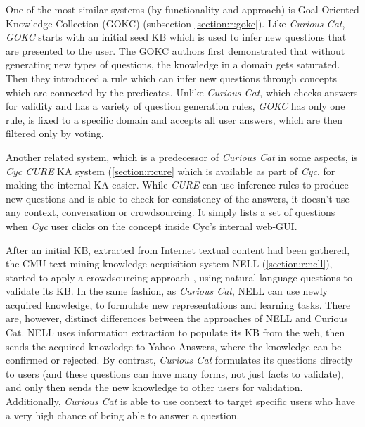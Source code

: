 One of the most similar systems (by functionality and approach) is 
Goal Oriented Knowledge Collection (GOKC) (subsection \ref{section:r:gokc}). 
Like 
\emph{Curious Cat}, \emph{GOKC} starts with an initial seed KB which is used 
to infer new questions that are presented to the user. The GOKC authors first 
demonstrated that without generating new types of questions, the knowledge in 
a domain gets saturated. Then they introduced a rule which can infer new 
questions through concepts which are connected by the predicates. Unlike 
\emph{Curious Cat}, which checks answers for validity and has a variety of 
question generation rules, \emph{GOKC} has only one rule, is fixed to a 
specific domain and accepts all user answers, which are then filtered only by 
voting.

Another related system, which is a predecessor of \emph{Curious Cat} in some 
aspects, is \emph{Cyc CURE} KA system (\autoref{section:r:cure} which is 
available as part of \emph{Cyc}, for making the internal KA easier. While 
\emph{CURE} can use inference rules to produce new questions and is able to
check for consistency of the answers, it doesn't use any context, conversation
or crowdsourcing. It simply lists a set of questions when \emph{Cyc} user clicks
on the concept inside Cyc's internal web-GUI.

After an initial KB, extracted from Internet textual content had been gathered, 
the CMU text-mining knowledge acquisition system NELL 
(\autoref{section:r:nell}), started to apply a crowdsourcing approach
\parencite{Pedro2013}, using natural language questions to validate its KB. 
In the same fashion, as \emph{Curious Cat}, NELL can use newly acquired 
knowledge, to formulate new representations and learning tasks. There are, 
however, distinct differences between the approaches of NELL and Curious Cat. 
NELL uses information extraction to populate its KB from the web, then sends 
the acquired knowledge to Yahoo Answers, where the knowledge can be confirmed 
or rejected. By contrast, \emph{Curious Cat} formulates its questions directly 
to users (and these questions can have many forms, not just facts to validate), 
and only then sends the new knowledge to other users for validation. 
Additionally, \emph{Curious Cat} is able to use context to target specific 
users who have a very high chance of being able to answer a question.

